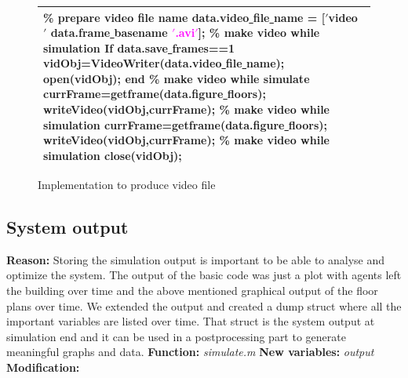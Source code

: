 \documentclass[11pt]{article}
\begin{document}
\begin{figure}[H]
\centering
\begin{tabular}
{|>{\large}m{\textwidth}|} \hline
\bigskip
\textcolor{commentcolor}{\% prepare video file name}
\newline
data.video\underline{ }file\underline{ }name = [\textcolor{stringcolor}{$'$video\underline{ }$'$} data.frame\underline{ }basename \textcolor{magenta}{$'$.avi$'$}];
\newline
\newline
\textcolor{commentcolor}{\% make video while simulation}
\newline
\textcolor{keywordcolor}{If} data.save\underline{ }frames==1
\newline
             vidObj=VideoWriter(data.video\underline{ }file\underline{ }name);
\newline
             open(vidObj);
\newline
\textcolor{keywordcolor}{end}
\newline
\newline
\textcolor{commentcolor}{\% make video while simulate   }
\newline
currFrame=getframe(data.figure\underline{ }floors);
\newline
writeVideo(vidObj,currFrame);
\newline
\newline
\textcolor{commentcolor}{\% make video while simulation}
\newline
currFrame=getframe(data.figure\underline{ }floors);
\newline
writeVideo(vidObj,currFrame);
\newline
\newline
\textcolor{commentcolor}{\% make video while simulation}
\newline
close(vidObj);
\bigskip
\\ \hline
\end{tabular}
\caption{Implementation to produce video file}
\end{figure}

\subsection{System output}
\textbf{Reason:}
\newline
Storing the simulation output is important to be able to analyse and optimize the system. The output of the basic code was just a plot with agents left the building over time and the above mentioned graphical output of the floor plans over time. We extended the output and created a dump struct where all the important variables are listed over time. That struct is the system output at simulation end and it can be used in a postprocessing part to generate meaningful graphs and data.
\newline
\textbf{Function:}
\newline
\textit{simulate.m}
\newline
\textbf{New variables:}
\newline
\textit{output}
\newline
\newpage
\textbf{Modification:}
\end{document}
